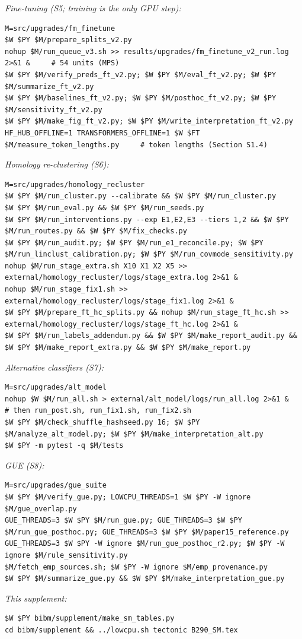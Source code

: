 \documentclass[journal,onecolumn,10pt,letterpaper]{IEEEtran}
\begin{document}
\noindent\emph{Fine-tuning (S5; training is the only GPU step):}
\begin{lstlisting}
M=src/upgrades/fm_finetune
$W $PY $M/prepare_splits_v2.py
nohup $M/run_queue_v3.sh >> results/upgrades/fm_finetune_v2_run.log 2>&1 &     # 54 units (MPS)
$W $PY $M/verify_preds_ft_v2.py; $W $PY $M/eval_ft_v2.py; $W $PY $M/summarize_ft_v2.py
$W $PY $M/baselines_ft_v2.py; $W $PY $M/posthoc_ft_v2.py; $W $PY $M/sensitivity_ft_v2.py
$W $PY $M/make_fig_ft_v2.py; $W $PY $M/write_interpretation_ft_v2.py
HF_HUB_OFFLINE=1 TRANSFORMERS_OFFLINE=1 $W $FT $M/measure_token_lengths.py     # token lengths (Section S1.4)
\end{lstlisting}
\noindent\emph{Homology re-clustering (S6):}
\begin{lstlisting}
M=src/upgrades/homology_recluster
$W $PY $M/run_cluster.py --calibrate && $W $PY $M/run_cluster.py
$W $PY $M/run_eval.py && $W $PY $M/run_seeds.py
$W $PY $M/run_interventions.py --exp E1,E2,E3 --tiers 1,2 && $W $PY $M/run_routes.py && $W $PY $M/fix_checks.py
$W $PY $M/run_audit.py; $W $PY $M/run_e1_reconcile.py; $W $PY $M/run_linclust_calibration.py; $W $PY $M/run_covmode_sensitivity.py
nohup $M/run_stage_extra.sh X10 X1 X2 X5 >> external/homology_recluster/logs/stage_extra.log 2>&1 &
nohup $M/run_stage_fix1.sh >> external/homology_recluster/logs/stage_fix1.log 2>&1 &
$W $PY $M/prepare_ft_hc_splits.py && nohup $M/run_stage_ft_hc.sh >> external/homology_recluster/logs/stage_ft_hc.log 2>&1 &
$W $PY $M/run_labels_addendum.py && $W $PY $M/make_report_audit.py && $W $PY $M/make_report_extra.py && $W $PY $M/make_report.py
\end{lstlisting}
\noindent\emph{Alternative classifiers (S7):}
\begin{lstlisting}
M=src/upgrades/alt_model
nohup $W $M/run_all.sh > external/alt_model/logs/run_all.log 2>&1 &     # then run_post.sh, run_fix1.sh, run_fix2.sh
$W $PY $M/check_shuffle_hashseed.py 16; $W $PY $M/analyze_alt_model.py; $W $PY $M/make_interpretation_alt.py
$W $PY -m pytest -q $M/tests
\end{lstlisting}
\noindent\emph{GUE (S8):}
\begin{lstlisting}
M=src/upgrades/gue_suite
$W $PY $M/verify_gue.py; LOWCPU_THREADS=1 $W $PY -W ignore $M/gue_overlap.py
GUE_THREADS=3 $W $PY $M/run_gue.py; GUE_THREADS=3 $W $PY $M/run_gue_posthoc.py; GUE_THREADS=3 $W $PY $M/paper15_reference.py
GUE_THREADS=3 $W $PY -W ignore $M/run_gue_posthoc_r2.py; $W $PY -W ignore $M/rule_sensitivity.py
$M/fetch_emp_sources.sh; $W $PY -W ignore $M/emp_provenance.py
$W $PY $M/summarize_gue.py && $W $PY $M/make_interpretation_gue.py
\end{lstlisting}
\noindent\emph{This supplement:}
\begin{lstlisting}
$W $PY bibm/supplement/make_sm_tables.py
cd bibm/supplement && ../lowcpu.sh tectonic B290_SM.tex
\end{lstlisting}
\end{document}
